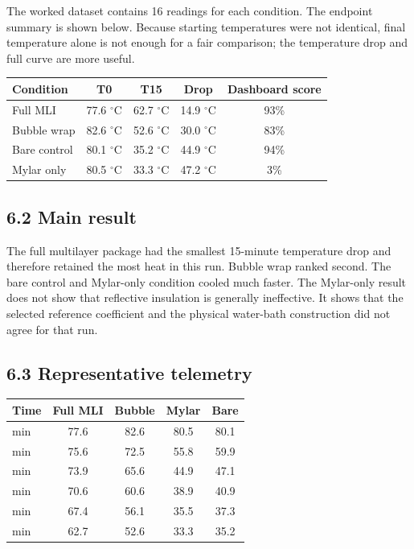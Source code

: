 \documentclass[10pt,conference,a4paper]{IEEEtran}
\begin{document}
The worked dataset contains 16 readings for each condition. The endpoint summary is shown below. Because starting temperatures were not identical, final temperature alone is not enough for a fair comparison; the temperature drop and full curve are more useful.

\begin{center}\footnotesize
\setlength{\tabcolsep}{2.5pt}
\renewcommand{\arraystretch}{1.14}
\begin{tabular}{>{\raggedright\arraybackslash}p{}cccc}
\toprule
\textbf{Condition} & \textbf{T0} & \textbf{T15} & \textbf{Drop} & \textbf{Dashboard score} \\
\midrule
Full MLI & 77.6 $^\circ$C & 62.7 $^\circ$C & 14.9 $^\circ$C & 93\% \\
Bubble wrap & 82.6 $^\circ$C & 52.6 $^\circ$C & 30.0 $^\circ$C & 83\% \\
Bare control & 80.1 $^\circ$C & 35.2 $^\circ$C & 44.9 $^\circ$C & 94\% \\
Mylar only & 80.5 $^\circ$C & 33.3 $^\circ$C & 47.2 $^\circ$C & 3\% \\
\bottomrule
\end{tabular}
\end{center}

\subsection*{6.2 Main result}

The full multilayer package had the smallest 15-minute temperature drop and therefore retained the most heat in this run. Bubble wrap ranked second. The bare control and Mylar-only condition cooled much faster. The Mylar-only result does not show that reflective insulation is generally ineffective. It shows that the selected reference coefficient and the physical water-bath construction did not agree for that run.

\subsection*{6.3 Representative telemetry}

\begin{center}\footnotesize
\setlength{\tabcolsep}{2.5pt}
\renewcommand{\arraystretch}{1.14}
\begin{tabular}{>{\raggedright\arraybackslash}p{}cccc}
\toprule
\textbf{Time} & \textbf{Full MLI} & \textbf{Bubble} & \textbf{Mylar} & \textbf{Bare} \\
\midrule
0 min & 77.6 & 82.6 & 80.5 & 80.1 \\
3 min & 75.6 & 72.5 & 55.8 & 59.9 \\
6 min & 73.9 & 65.6 & 44.9 & 47.1 \\
9 min & 70.6 & 60.6 & 38.9 & 40.9 \\
12 min & 67.4 & 56.1 & 35.5 & 37.3 \\
15 min & 62.7 & 52.6 & 33.3 & 35.2 \\
\bottomrule
\end{tabular}
\end{center}
\end{document}
